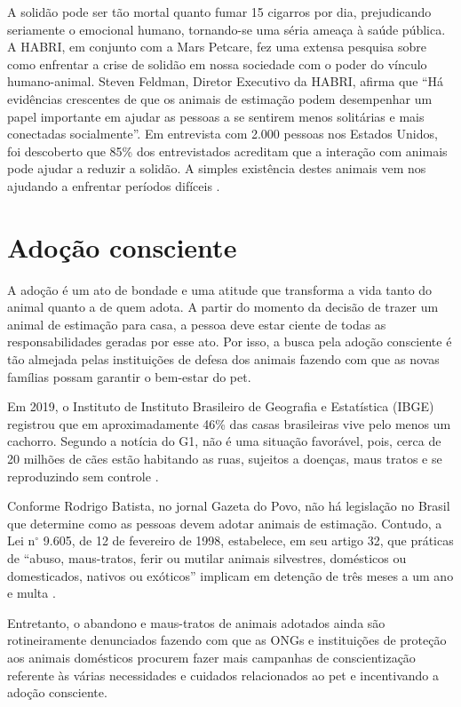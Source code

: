 A solidão pode ser tão mortal quanto fumar 15 cigarros por dia, prejudicando seriamente o emocional humano, tornando-se uma séria ameaça à saúde pública. A \ac{HABRI}, em conjunto com a Mars Petcare, fez uma extensa pesquisa sobre como enfrentar a crise de solidão em nossa sociedade com o poder do vínculo humano-animal. Steven Feldman, Diretor Executivo da \ac{HABRI}, afirma que “Há evidências crescentes de que os animais de estimação podem desempenhar um papel importante em ajudar as pessoas a se sentirem menos solitárias e mais conectadas socialmente”. Em entrevista com 2.000 pessoas nos Estados Unidos, foi descoberto que 85\% dos entrevistados acreditam que a interação com animais pode ajudar a reduzir a solidão. A simples existência destes animais vem nos ajudando a enfrentar períodos difíceis \cite{mentalpets}.

\section{Adoção consciente}
A adoção é um ato de bondade e uma atitude que transforma a vida tanto do animal quanto a de quem adota. A partir do momento da decisão de trazer um animal de estimação para casa, a pessoa deve estar ciente de todas as responsabilidades geradas por esse ato. Por isso, a busca pela adoção consciente é tão almejada pelas instituições de defesa dos animais fazendo com que as novas famílias possam garantir o bem-estar do pet. 

Em 2019, o Instituto de Instituto Brasileiro de Geografia e Estatística (IBGE) registrou que em aproximadamente 46\% das casas brasileiras vive pelo menos um cachorro. Segundo a notícia do G1, não é uma situação favorável, pois, cerca de 20 milhões de cães estão habitando as ruas, sujeitos a doenças, maus tratos e se reproduzindo sem controle \cite{adocao_conscientetres,adocao_conscientecinco}.

Conforme Rodrigo Batista, no jornal Gazeta do Povo, não há legislação no Brasil que determine como as pessoas devem adotar animais de estimação. Contudo, a Lei n$^\circ$ 9.605, de 12 de fevereiro de 1998, estabelece, em seu artigo 32, que práticas de “abuso, maus-tratos, ferir ou mutilar animais silvestres, domésticos ou domesticados, nativos ou exóticos” implicam em detenção de três meses a um ano e multa \cite{adocao_consciente}.

Entretanto, o abandono e maus-tratos de animais adotados ainda são rotineiramente denunciados fazendo com que as \ac{ONGs} e instituições de proteção aos animais domésticos procurem fazer mais campanhas de conscientização referente às várias necessidades e cuidados relacionados ao pet e incentivando a adoção consciente.  

